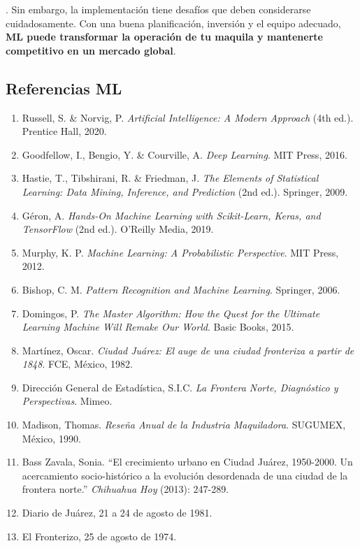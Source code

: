 \documentclass[
  10pt,
  letterpaper,
]{book}
\begin{document}
. Sin embargo, la implementación tiene desafíos que deben considerarse
cuidadosamente. Con una buena planificación, inversión y el equipo
adecuado, \textbf{ML puede transformar la operación de tu maquila y
mantenerte competitivo en un mercado global}.

\subsection{Referencias ML}\label{referencias-ml}

\begin{enumerate}
\def\labelenumi{\arabic{enumi}.}
\item
  Russell, S. \& Norvig, P. \emph{Artificial Intelligence: A Modern
  Approach} (4th ed.). Prentice Hall, 2020.
\item
  Goodfellow, I., Bengio, Y. \& Courville, A. \emph{Deep Learning}. MIT
  Press, 2016.
\item
  Hastie, T., Tibshirani, R. \& Friedman, J. \emph{The Elements of
  Statistical Learning: Data Mining, Inference, and Prediction} (2nd
  ed.). Springer, 2009.
\item
  Géron, A. \emph{Hands-On Machine Learning with Scikit-Learn, Keras,
  and TensorFlow} (2nd ed.). O'Reilly Media, 2019.
\item
  Murphy, K. P. \emph{Machine Learning: A Probabilistic Perspective}.
  MIT Press, 2012.
\item
  Bishop, C. M. \emph{Pattern Recognition and Machine Learning}.
  Springer, 2006.
\item
  Domingos, P. \emph{The Master Algorithm: How the Quest for the
  Ultimate Learning Machine Will Remake Our World}. Basic Books, 2015.
\item
  Martínez, Oscar. \emph{Ciudad Juárez: El auge de una ciudad fronteriza
  a partir de 1848}. FCE, México, 1982.
\item
  Dirección General de Estadística, S.I.C. \emph{La Frontera Norte,
  Diagnóstico y Perspectivas}. Mimeo.
\item
  Madison, Thomas. \emph{Reseña Anual de la Industria Maquiladora}.
  SUGUMEX, México, 1990.
\item
  Bass Zavala, Sonia. ``El crecimiento urbano en Ciudad Juárez,
  1950-2000. Un acercamiento socio-histórico a la evolución desordenada
  de una ciudad de la frontera norte.'' \emph{Chihuahua Hoy} (2013):
  247-289.
\item
  Diario de Juárez, 21 a 24 de agosto de 1981.
\item
  El Fronterizo, 25 de agosto de 1974.

\end{enumerate}
\end{document}
